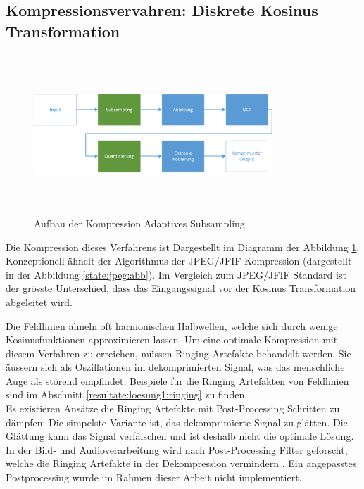 \subsection{Kompressionsvervahren: Diskrete Kosinus Transformation}\label{konzept:loesung1}
\begin{figure}[!htbp]
	\center
	\includegraphics[width=0.8\textwidth,height=6cm,keepaspectratio]{./pictures/konzept/solution1/aufbau.png}
	\caption{Aufbau der Kompression Adaptives Subsampling.}
	\label{konzept:loesung1:aufbau}
\end{figure} 
Die Kompression dieses Verfahrens ist Dargestellt im Diagramm der Abbildung \ref{konzept:loesung1:aufbau}. Konzeptionell ähnelt der Algorithmus der JPEG/JFIF Kompression (dargestellt in der Abbildung \ref{state:jpeg:abb}). Im Vergleich zum JPEG/JFIF Standard ist der grösste Unterschied, dass das Eingangssignal vor der Kosinus Transformation abgeleitet wird.

Die Feldlinien ähneln oft harmonischen Halbwellen, welche sich durch wenige Kosinusfunktionen approximieren lassen. Um eine optimale Kompression mit diesem Verfahren zu erreichen, müssen Ringing Artefakte \cite{wiki:ringing:artefacts} behandelt werden. Sie äussern sich als Oszillationen im dekomprimierten Signal, was das menschliche Auge als störend empfindet. Beispiele für die Ringing Artefakten von Feldlinien sind im Abschnitt \ref{resultate:loesung1:ringing} zu finden.\\
Es existieren Ansätze die Ringing Artefakte mit Post-Processing Schritten zu dämpfen: Die simpelste Variante ist, das dekomprimierte Signal zu glätten. Die Glättung kann das Signal verfälschen und ist deshalb nicht die optimale Lösung. In der Bild- und Audioverarbeitung wird nach Post-Processing Filter geforscht, welche die Ringing Artefakte in der Dekompression vermindern \cite{kaup1998reduction} \cite{park1999postprocessing}. Ein angepasstes Postprocessing wurde im Rahmen dieser Arbeit nicht implementiert.

